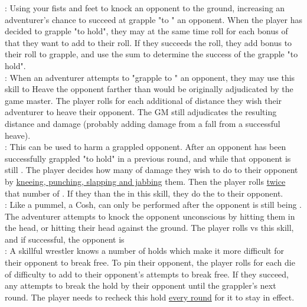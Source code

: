 \begin{multicols*}{2}
{:  Using your fists and feet to knock an opponent to the ground, increasing an adventurer's chance to succeed at grapple "to " an opponent. When the player has decided to grapple "to hold", they may at the same time roll  for each bonus of  that they want to add to their  roll. If they succeeds the roll, they add bonus to their  roll to grapple, and use the sum to determine the success of the grapple "to hold". \\

: When an adventurer attempts to "grapple to " an opponent, they may use this skill to Heave the opponent farther than would be originally adjudicated by the game master. The player rolls  for each additional  of distance they wish their adventurer to heave their opponent. The GM still adjudicates the resulting distance and damage (probably adding damage from a fall from a successful heave).\\

: This can be used to harm a grappled opponent. After an opponent has been successfully grappled "to hold" in a previous round, and while that opponent is still . The player decides how many  of damage they wish to do to their opponent by \ul{kneeing, punching, slapping and jabbing} them. Then the player rolls \ul{twice} that number of . If they  than the  in this skill, they do the  to their opponent.\\

: Like a pummel, a Cosh, can only be performed after the opponent is still being . The adventurer attempts to knock the opponent unconscious by hitting them in the head, or hitting their head against the ground. The player rolls  vs this skill, and if successful, the opponent is \\

: A skillful wrestler knows a number of holds which make it more difficult for their opponent to break free. To pin their opponent, the player rolls  for each die of difficulty to add to their opponent's attempts to break free. If they succeed, any attempts to break the hold by their opponent  until the grappler's next round. The player needs to recheck this hold \ul{every round} for it to stay in effect.\\

}
\end{multicols*}

